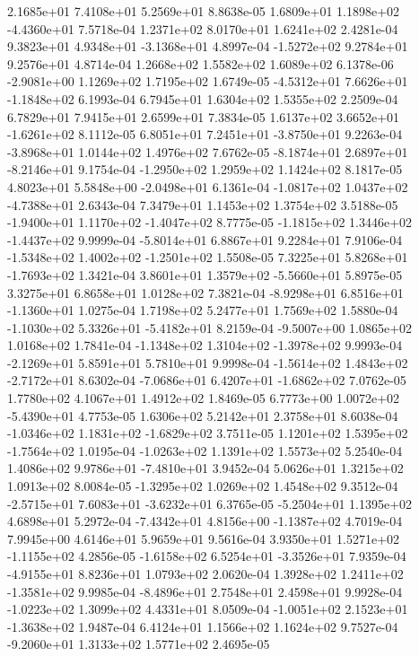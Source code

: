 2.1685e+01 7.4108e+01 5.2569e+01  8.8638e-05
 1.6809e+01  1.1898e+02 -4.4360e+01  7.5718e-04
1.2371e+02 8.0170e+01 1.6241e+02  2.4281e-04
 9.3823e+01  4.9348e+01 -3.1368e+01  4.8997e-04
-1.5272e+02  9.2784e+01  9.2576e+01  4.8714e-04
1.2668e+02 1.5582e+02 1.6089e+02  6.1378e-06
-2.9081e+00  1.1269e+02  1.7195e+02  1.6749e-05
-4.5312e+01  7.6626e+01 -1.1848e+02  6.1993e-04
6.7945e+01 1.6304e+02 1.5355e+02  2.2509e-04
6.7829e+01 7.9415e+01 2.6599e+01  7.3834e-05
 1.6137e+02  3.6652e+01 -1.6261e+02  8.1112e-05
 6.8051e+01  7.2451e+01 -3.8750e+01  9.2263e-04
-3.8968e+01  1.0144e+02  1.4976e+02  7.6762e-05
-8.1874e+01  2.6897e+01 -8.2146e+01  9.1754e-04
-1.2950e+02  1.2959e+02  1.1424e+02  8.1817e-05
 4.8023e+01  5.5848e+00 -2.0498e+01  6.1361e-04
-1.0817e+02  1.0437e+02 -4.7388e+01  2.6343e-04
7.3479e+01 1.1453e+02 1.3754e+02  3.5188e-05
-1.9400e+01  1.1170e+02 -1.4047e+02  8.7775e-05
-1.1815e+02  1.3446e+02 -1.4437e+02  9.9999e-04
-5.8014e+01  6.8867e+01  9.2284e+01  7.9106e-04
-1.5348e+02  1.4002e+02 -1.2501e+02  1.5508e-05
 7.3225e+01  5.8268e+01 -1.7693e+02  1.3421e-04
 3.8601e+01  1.3579e+02 -5.5660e+01  5.8975e-05
3.3275e+01 6.8658e+01 1.0128e+02  7.3821e-04
-8.9298e+01  6.8516e+01 -1.1360e+01  1.0275e-04
1.7198e+02 5.2477e+01 1.7569e+02  1.5880e-04
-1.1030e+02  5.3326e+01 -5.4182e+01  8.2159e-04
-9.5007e+00  1.0865e+02  1.0168e+02  1.7841e-04
-1.1348e+02  1.3104e+02 -1.3978e+02  9.9993e-04
-2.1269e+01  5.8591e+01  5.7810e+01  9.9998e-04
-1.5614e+02  1.4843e+02 -2.7172e+01  8.6302e-04
-7.0686e+01  6.4207e+01 -1.6862e+02  7.0762e-05
1.7780e+02 4.1067e+01 1.4912e+02  1.8469e-05
 6.7773e+00  1.0072e+02 -5.4390e+01  4.7753e-05
1.6306e+02 5.2142e+01 2.3758e+01  8.6038e-04
-1.0346e+02  1.1831e+02 -1.6829e+02  3.7511e-05
 1.1201e+02  1.5395e+02 -1.7564e+02  1.0195e-04
-1.0263e+02  1.1391e+02  1.5573e+02  5.2540e-04
 1.4086e+02  9.9786e+01 -7.4810e+01  3.9452e-04
5.0626e+01 1.3215e+02 1.0913e+02  8.0084e-05
-1.3295e+02  1.0269e+02  1.4548e+02  9.3512e-04
-2.5715e+01  7.6083e+01 -3.6232e+01  6.3765e-05
-5.2504e+01  1.1395e+02  4.6898e+01  5.2972e-04
-7.4342e+01  4.8156e+00 -1.1387e+02  4.7019e-04
7.9945e+00 4.6146e+01 5.9659e+01  9.5616e-04
 3.9350e+01  1.5271e+02 -1.1155e+02  4.2856e-05
-1.6158e+02  6.5254e+01 -3.3526e+01  7.9359e-04
-4.9155e+01  8.8236e+01  1.0793e+02  2.0620e-04
 1.3928e+02  1.2411e+02 -1.3581e+02  9.9985e-04
-8.4896e+01  2.7548e+01  2.4598e+01  9.9928e-04
-1.0223e+02  1.3099e+02  4.4331e+01  8.0509e-04
-1.0051e+02  2.1523e+01 -1.3638e+02  1.9487e-04
6.4124e+01 1.1566e+02 1.1624e+02  9.7527e-04
-9.2060e+01  1.3133e+02  1.5771e+02  2.4695e-05
